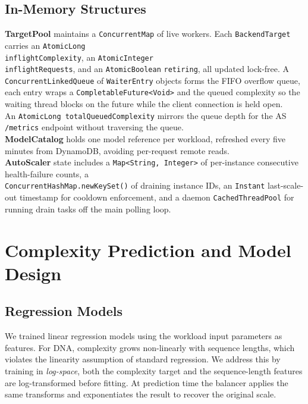 \documentclass[10pt]{article}
\begin{document}
\subsection{In-Memory Structures}
\textbf{TargetPool} maintains a \texttt{ConcurrentMap} of live workers. Each
\texttt{BackendTarget} carries an \texttt{AtomicLong} \\ \texttt{inflightComplexity}, an
\texttt{AtomicInteger} \\ \texttt{inflightRequests}, and an \texttt{AtomicBoolean}
\texttt{retiring}, all updated lock-free. A \texttt{ConcurrentLinkedQueue} of
\texttt{WaiterEntry} objects forms the FIFO overflow queue, each entry wraps a
\texttt{CompletableFuture<Void>} and the queued complexity so the waiting
thread blocks on the future while the client connection is held open.\\ An
\texttt{AtomicLong totalQueuedComplexity} mirrors the queue depth for the AS
\texttt{/metrics} endpoint without traversing the queue.\\
\textbf{ModelCatalog} holds one model reference per workload, refreshed every
five minutes from DynamoDB, avoiding per-request remote reads. \\
\textbf{AutoScaler} state includes a \texttt{Map<String, Integer>} of
per-instance consecutive health-failure counts, a \\
\texttt{ConcurrentHashMap.newKeySet()} of draining instance IDs, an
\texttt{Instant} last-scale-out timestamp for cooldown enforcement, and a
daemon \texttt{CachedThreadPool} for running drain tasks off the main polling
loop.

\section{Complexity Prediction and Model Design}

\subsection{Regression Models}
We trained linear regression models using the workload input parameters as
features. For DNA, complexity grows non-linearly with sequence lengths, which
violates the linearity assumption of standard regression. We address this by
training in \emph{log-space}, both the complexity target and the sequence-length
features are log-transformed before fitting. At prediction time the balancer
applies the same transforms and exponentiates the result to recover the original
scale.
\end{document}
